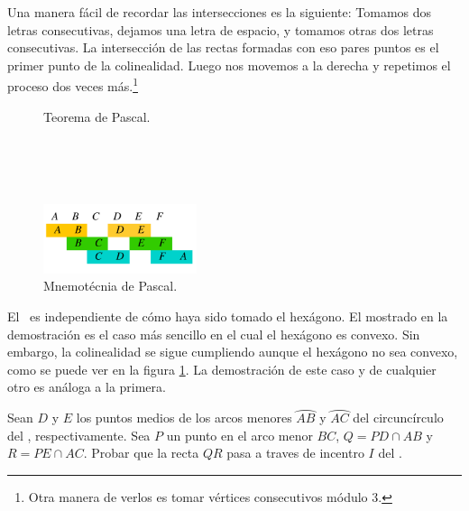 \begin{remark.tcb}
    Una manera fácil de recordar las intersecciones es la siguiente:
    Tomamos dos letras consecutivas, dejamos una letra de espacio, y tomamos otras dos letras consecutivas.
    La intersección de las rectas formadas con eso pares puntos es el primer punto de la colinealidad.
    Luego nos movemos a la derecha y repetimos el proceso dos veces más.\footnote{Otra manera de verlos es tomar vértices consecutivos módulo 3.}
    \begin{multicols}{2}
        \begin{figure}[H]
            \centering
            
            \caption{Teorema de Pascal.}
            \label{fig:pascal-theorem}
        \end{figure}
        \hfill\\
        \hfill\\
        \hfill\\
        \hfill
        \begin{figure}[H]
            \centering
            \includegraphics[width=0.4\textwidth]{images/pascal-mnemotec}
            \caption{Mnemotécnia de Pascal.}
        \end{figure}
    \end{multicols}
\end{remark.tcb}


El~ es independiente de cómo haya sido tomado el hexágono.
El mostrado en la demostración es el caso más sencillo en el cual el hexágono es convexo.
Sin embargo, la colinealidad se sigue cumpliendo aunque el hexágono no sea convexo, como se puede ver en la figura \ref{fig:pascal-theorem}.
La demostración de este caso y de cualquier otro es análoga a la primera.

\begin{section-example.tcb}{}{}
    Sean $D$ y $E$ los puntos medios de los arcos menores $\wideparen{AB}$ y $\wideparen{AC}$ del circuncírculo del , respectivamente.
    Sea $P$ un punto en el arco menor $BC$, $Q = PD \cap AB$ y $R = PE \cap AC$.
    Probar que la recta $QR$ pasa a traves de incentro $I$ del .
\end{section-example.tcb}

